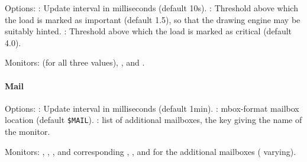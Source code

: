 Options: : Update interval in milliseconds
(default 10s). : Threshold above which 
the load is marked as important (default 1.5), so that the 
drawing engine may be suitably hinted. : 
Threshold above which  the load is marked as critical (default 4.0).


Monitors:  (for all three values), 
,  and .


\paragraph{Mail}

Options: : Update interval in milliseconds
(default 1min). : mbox-format mailbox location
(default \verb!$MAIL!). 
: list of additional mailboxes, the key giving the 
name of the monitor.

Monitors: , ,
, and corresponding
, , and 
for the additional mailboxes (\codestr{*} varying).
